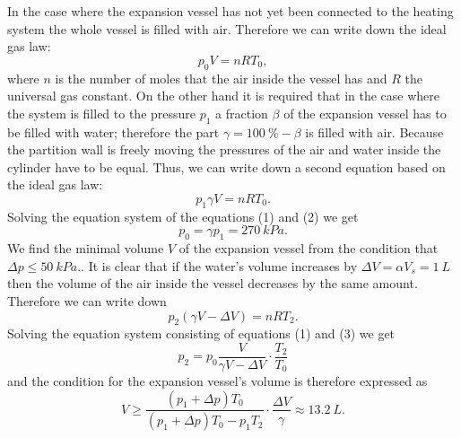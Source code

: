 \documentclass[11pt]{article}
\begin{document}
\solueng
In the case where the expansion vessel has not yet been connected to the heating system the whole vessel is filled with air. Therefore we can write down the ideal gas law:
\begin{equation}
p_{0}V=nRT_{0},\label{eq:2016-lahg-07-paisupaak-eq1}
\end{equation} 
where $n$ is the number of moles that the air inside the vessel has and $R$ the universal gas constant. On the other hand it is required that in the case where the system is filled to the pressure $p_{1}$ a fraction $\beta$ of the expansion vessel has to be filled with water; therefore the part $\gamma=\SI{100}{\%}-\beta$ is filled with air. Because the partition wall is freely moving the pressures of the air and water inside the cylinder have to be equal. Thus, we can write down a second equation based on the ideal gas law:
\begin{equation}
p_{1}\gamma V=nRT_{0}.\label{eq:2016-lahg-07-paisupaak-eq2}
\end{equation} 
Solving the equation system of the equations (1) and (2) we get
\[
p_{0}=\gamma p_{1}=\SI{270}{kPa}.
\] 
We find the minimal volume $V$ of the expansion vessel from the condition that $\Delta p\leq\SI{50}{kPa}.$. It is clear that if the water’s volume increases by $\Delta V=\alpha V_{s}=\SI{1}{L}$ then the volume of the air inside the vessel decreases by the same amount. Therefore we can write down
\begin{equation}
p_{2}\left(\gamma V-\Delta V\right)=nRT_{2}.\label{eq:2016-lahg-07-paisupaak-eq3}
\end{equation} 
Solving the equation system consisting of equations (1) and (3) we get
\[
p_{2}=p_{0}\frac{V}{\gamma V-\Delta V}\cdot\frac{T_{2}}{T_{0}}
\] 
and the condition for the expansion vessel’s volume is therefore expressed as 
\[
V\geq\frac{\left(p_{1}+\Delta p\right)T_{0}}{\left(p_{1}+\Delta p\right)T_{0}-p_{1}T_{2}}\cdot\frac{\Delta V}{\gamma}\approx\SI{13.2}{L}.
\]
\probend
\bigskip

\end{document}
